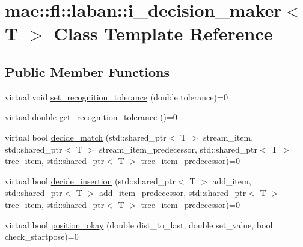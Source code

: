 \hypertarget{classmae_1_1fl_1_1laban_1_1i__decision__maker}{\section{mae\-:\-:fl\-:\-:laban\-:\-:i\-\_\-decision\-\_\-maker$<$ T $>$ Class Template Reference}
\label{classmae_1_1fl_1_1laban_1_1i__decision__maker}
}
\subsection*{Public Member Functions}
\begin{DoxyCompactItemize}
\item 
virtual void \hyperlink{classmae_1_1fl_1_1laban_1_1i__decision__maker_a63f05f6a3fb2a5f3b53f6555eada6243}{set\-\_\-recognition\-\_\-tolerance} (double tolerance)=0
\item 
virtual double \hyperlink{classmae_1_1fl_1_1laban_1_1i__decision__maker_aa892f42c6407b3f8c9a67b71993103ea}{get\-\_\-recognition\-\_\-tolerance} ()=0
\item 
virtual bool \hyperlink{classmae_1_1fl_1_1laban_1_1i__decision__maker_ae1eb31ffcd38bcf0b207fee760ce98a6}{decide\-\_\-match} (std\-::shared\-\_\-ptr$<$ T $>$ stream\-\_\-item, std\-::shared\-\_\-ptr$<$ T $>$ stream\-\_\-item\-\_\-predecessor, std\-::shared\-\_\-ptr$<$ T $>$ tree\-\_\-item, std\-::shared\-\_\-ptr$<$ T $>$ tree\-\_\-item\-\_\-predecessor)=0
\item 
virtual bool \hyperlink{classmae_1_1fl_1_1laban_1_1i__decision__maker_a728e6e706f54a6f8dfbeff9a267afbf4}{decide\-\_\-insertion} (std\-::shared\-\_\-ptr$<$ T $>$ add\-\_\-item, std\-::shared\-\_\-ptr$<$ T $>$ add\-\_\-item\-\_\-predecessor, std\-::shared\-\_\-ptr$<$ T $>$ tree\-\_\-item, std\-::shared\-\_\-ptr$<$ T $>$ tree\-\_\-item\-\_\-predecessor)=0
\item 
virtual bool \hyperlink{classmae_1_1fl_1_1laban_1_1i__decision__maker_aad9230ee447afc0d6cf70cd74c54cf41}{position\-\_\-okay} (double dist\-\_\-to\-\_\-last, double set\-\_\-value, bool check\-\_\-startpose)=0
\end{DoxyCompactItemize}


